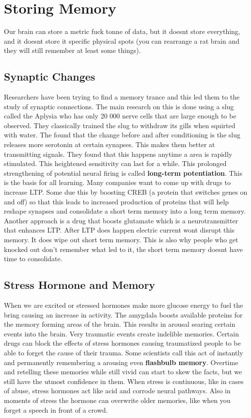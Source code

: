 \documentclass[12pt]{article}
\begin{document}
\section*{Storing Memory}
Our brain can store a metric fuck tonne of data, but it doesnt store everything, and it doesnt store it specific physical spots (you can rearrange a rat brain and they will still remember at least some things).
\subsection*{Synaptic Changes} 
Researchers have been trying to find a memory trance and this led them to the study of synaptic connections. The main research on this is done using a slug called the Aplysia who has only 20 000 nerve cells that are large enough to be observed. They classically trained the slug to withdraw its gills when squirted with water. The found that the change before and after conditioning is the slug releases more serotonin at certain synapses. This makes them better at transmitting signals. They found that this happens anytime a area is rapidly stimulated. This heightened sensitivity can last for a while. This prolonged strengthening of potential neural firing is called \textbf{long-term potentiation}. This is the basis for all learning. Many companies want to come up with drugs to increase LTP. Some due this by boosting CREB (a protein that switches genes on and off) so that this leads to increased production of proteins that will help reshape synapses and consolidate a short term memory into a long term memory. Another approach is a drug that boosts glutamate which is a neurotransmitter that enhances LTP. After LTP does happen electric current wont disrupt this memory. It does wipe out short term memory. This is also why people who get knocked out don’t remember what led to it, the short term memory doesnt have time to consolidate.
\subsection*{Stress Hormone and Memory} 
When we are excited or stressed hormones make more glucose energy to fuel the bring causing an increase in activity. The amygdala boosts available proteins for the memory forming areas of the brain. This results in arousal searing certain events into the brain. Very traumatic events create indelible memories. Certain drugs can block the effects of stress hormones causing traumatized people to be able to forget the cause of their trauma. Some scientists call this act of instantly and permanently remembering a arousing even \textbf{flashbulb memory}. Overtime and retelling these memories while still vivid can start to skew the facts, but we still have the utmost confidence in them. When stress is continuous, like in cases of abuse, stress hormones act like acid and corrode neural pathways. Also in moments of stress the hormone can overwrite older memories, like when you forget a speech in front of a crowd.
\end{document}
